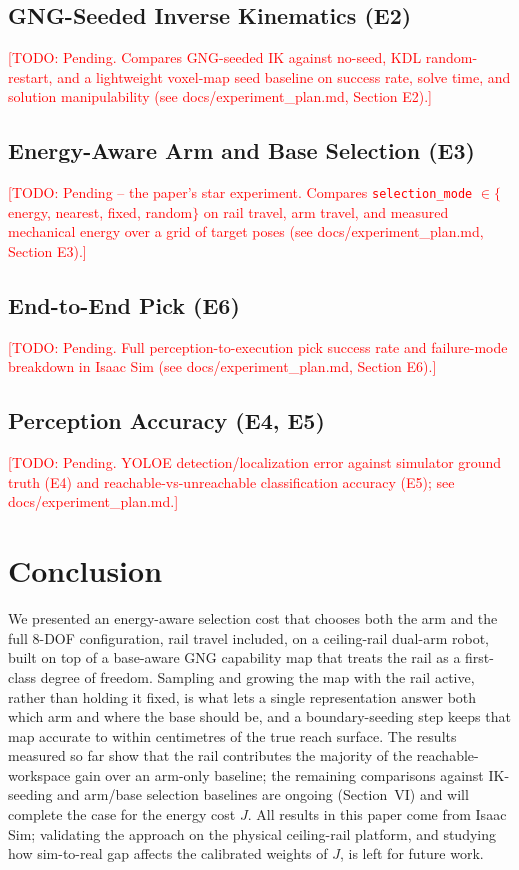 \documentclass[conference]{IEEEtran}
\newcommand{\TODO}[1]{\textcolor{red}{[TODO: #1]}}
\begin{document}
\subsection{GNG-Seeded Inverse Kinematics (E2)}
\TODO{Pending. Compares GNG-seeded IK against no-seed, KDL random-restart, and a
lightweight voxel-map seed baseline on success rate, solve time, and solution
manipulability (see docs/experiment\_plan.md, Section E2).}

\subsection{Energy-Aware Arm and Base Selection (E3)}
\TODO{Pending -- the paper's star experiment. Compares \texttt{selection\_mode}
$\in\{$energy, nearest, fixed, random$\}$ on rail travel, arm travel, and measured
mechanical energy over a grid of target poses (see docs/experiment\_plan.md,
Section E3).}

\subsection{End-to-End Pick (E6)}
\TODO{Pending. Full perception-to-execution pick success rate and failure-mode
breakdown in Isaac Sim (see docs/experiment\_plan.md, Section E6).}

\subsection{Perception Accuracy (E4, E5)}
\TODO{Pending. YOLOE detection/localization error against simulator ground truth
(E4) and reachable-vs-unreachable classification accuracy (E5); see
docs/experiment\_plan.md.}

\section{Conclusion}

We presented an energy-aware selection cost that chooses both the arm and the full
8-DOF configuration, rail travel included, on a ceiling-rail dual-arm robot, built
on top of a base-aware GNG capability map that treats the rail as a first-class
degree of freedom. Sampling and growing the map with the rail active, rather than
holding it fixed, is what lets a single representation answer both which arm and
where the base should be, and a boundary-seeding step keeps that map accurate to
within centimetres of the true reach surface. The results measured so far show
that the rail contributes the majority of the reachable-workspace gain over an
arm-only baseline; the remaining comparisons against IK-seeding and arm/base
selection baselines are ongoing (Section~VI) and will complete the case for the
energy cost $J$. All results in this paper come from Isaac Sim; validating the
approach on the physical ceiling-rail platform, and studying how sim-to-real gap
affects the calibrated weights of $J$, is left for future work.
\end{document}
